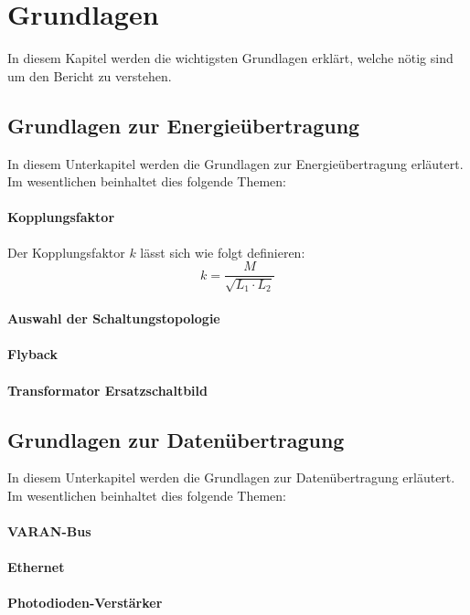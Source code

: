 \section{Grundlagen}
In diesem Kapitel werden die wichtigsten Grundlagen erklärt, welche nötig sind um den Bericht zu verstehen.
\subsection{Grundlagen zur Energieübertragung}
In diesem Unterkapitel werden die Grundlagen zur Energieübertragung erläutert. Im wesentlichen beinhaltet dies folgende Themen:

\paragraph{Kopplungsfaktor}
Der Kopplungsfaktor $ k $ lässt sich wie folgt definieren:
\begin{equation}
k=\frac{M}{\sqrt{L_{1}\cdot L_{2}}}
\label{eq:kopplungsfaktor}
\end{equation}

\paragraph{Auswahl der Schaltungstopologie}

\paragraph{Flyback}

\paragraph{Transformator Ersatzschaltbild}

\subsection{Grundlagen zur Datenübertragung}
In diesem Unterkapitel werden die Grundlagen zur Datenübertragung erläutert. Im wesentlichen beinhaltet dies folgende Themen:
\paragraph{VARAN-Bus}
\paragraph{Ethernet}
\paragraph{Photodioden-Verstärker}